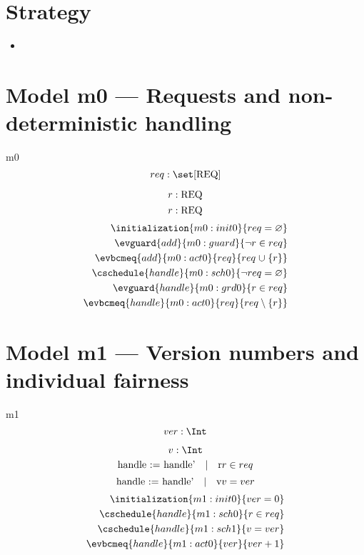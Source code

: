 \documentclass[12pt]{amsart}
\newcommand{\REQ}{\text{REQ}}
\begin{document}
\section{Strategy}

\begin{itemize}
  \item 
\end{itemize}
\section{Model m0 --- Requests and non-deterministic handling}
\begin{machine}{m0}
  \newset{\REQ} 
  \[ \variable{ req : \set [\REQ] } \]
  \begin{description}
  \end{description}
  \[ \param{add}{ r : \REQ } \]
  \[ \param{handle}{ r : \REQ } \]
  \begin{align*}
      \initialization{m0:init0}{ req = \emptyset } \\
      \evguard{add}{m0:guard}{ \neg r \in req } \\
      \evbcmeq{add}{m0:act0}{req}{ req \bunion \{ r \} } \\
      \cschedule{handle}{m0:sch0}{ \neg req = \emptyset } \\
      \evguard{handle}{m0:grd0}{ r \in req } \\
      \evbcmeq{handle}{m0:act0}{req}{ req \setminus \{ r \} } 
  \end{align*}

\noindent
\end{machine}
\section{Model m1 --- Version numbers and individual fairness}
\begin{machine}{m1}
  \[ \variable{ ver : \Int } \]
  \begin{description}
  \end{description}
  \[ \indices{handle}{ v : \Int } \]
  \[\witness{handle}{r}{r \in req}\]
  \[\witness{handle}{v}{v = ver}\]
  \begin{align}
      \initialization{m1:init0}{ ver = 0 } \\
      \cschedule{handle}{m1:sch0}{ r \in req } \\
      \cschedule{handle}{m1:sch1}{ v = ver } \\
      \evbcmeq{handle}{m1:act0}{ver}{ ver + 1 } 
  \end{align}
\end{machine}
\end{document}
